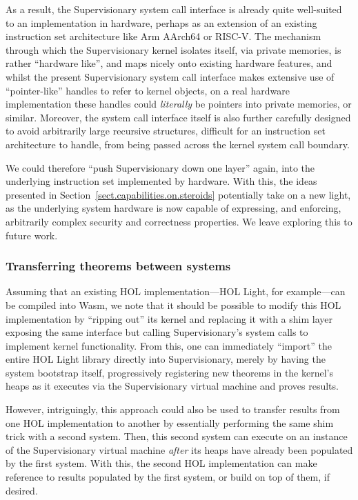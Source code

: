 \documentclass[a4paper, UKenglish, cleveref, autoref, thm-restate, colorlinks]{lipics-v2021}
\begin{document}
As a result, the Supervisionary system call interface is already quite well-suited to an implementation in hardware, perhaps as an extension of an existing instruction set architecture like Arm AArch64 or RISC-V.
The mechanism through which the Supervisionary kernel isolates itself, via private memories, is rather ``hardware like'', and maps nicely onto existing hardware features, and whilst the present Supervisionary system call interface makes extensive use of ``pointer-like'' handles to refer to kernel objects, on a real hardware implementation these handles could \emph{literally} be pointers into private memories, or similar.
Moreover, the system call interface itself is also further carefully designed to avoid arbitrarily large recursive structures, difficult for an instruction set architecture to handle, from being passed across the kernel system call boundary.

We could therefore ``push Supervisionary down one layer'' again, into the underlying instruction set implemented by hardware.
With this, the ideas presented in Section~\ref{sect.capabilities.on.steroids} potentially take on a new light, as the underlying system hardware is now capable of expressing, and enforcing, arbitrarily complex security and correctness properties.
We leave exploring this to future work.

\subsubsection*{Transferring theorems between systems}

Assuming that an existing HOL implementation---HOL Light, for example---can be compiled into Wasm, we note that it should be possible to modify this HOL implementation by ``ripping out'' its kernel and replacing it with a shim layer exposing the same interface but calling Supervisionary's system calls to implement kernel functionality.
From this, one can immediately ``import'' the entire HOL Light library directly into Supervisionary, merely by having the system bootstrap itself, progressively registering new theorems in the kernel's heaps as it executes via the Supervisionary virtual machine and proves results.

However, intriguingly, this approach could also be used to transfer results from one HOL implementation to another by essentially performing the same shim trick with a second system.
Then, this second system can execute on an instance of the Supervisionary virtual machine \emph{after} its heaps have already been populated by the first system.
With this, the second HOL implementation can make reference to results populated by the first system, or build on top of them, if desired.
\end{document}
